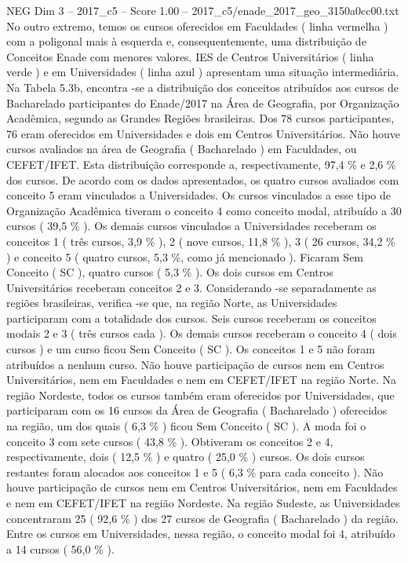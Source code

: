 \begin{textsample}{NEG Dim 3 – 2017\_c5 – Score 1.00 – 2017\_c5/enade\_2017\_geo\_3150a0cc00.txt}
No outro extremo, temos os cursos oferecidos em Faculdades ( linha vermelha ) com a poligonal mais à esquerda e, consequentemente, uma distribuição de Conceitos Enade com menores valores.
IES de Centros Universitários ( linha verde ) e em Universidades ( linha azul ) apresentam uma situação intermediária.
Na Tabela 5.3b, encontra -se a distribuição dos conceitos atribuídos aos cursos de Bacharelado participantes do Enade/2017 na Área de Geografia, por Organização Acadêmica, segundo as Grandes Regiões brasileiras.
Dos 78 cursos participantes, 76 eram oferecidos em Universidades e dois em Centros Universitários.
Não houve cursos avaliados na área de Geografia ( Bacharelado ) em Faculdades, ou CEFET/IFET.
Esta distribuição corresponde a, respectivamente, 97,4 \% e 2,6 \% dos cursos.
De acordo com os dados apresentados, os quatro cursos avaliados com conceito 5 eram vinculados a Universidades.
Os cursos vinculados a esse tipo de Organização Acadêmica tiveram o conceito 4 como conceito modal, atribuído a 30 cursos ( 39,5 \% ).
Os demais cursos vinculados a Universidades receberam os conceitos 1 ( três cursos, 3,9 \% ), 2 ( nove cursos, 11,8 \% ), 3 ( 26 cursos, 34,2 \% ) e conceito 5 ( quatro cursos, 5,3 \%, como já mencionado ).
Ficaram Sem Conceito ( SC ), quatro cursos ( 5,3 \% ).
Os dois cursos em Centros Universitários receberam conceitos 2 e 3.
Considerando -se separadamente as regiões brasileiras, verifica -se que, na região Norte, as Universidades participaram com a totalidade dos cursos.
Seis cursos receberam os conceitos modais 2 e 3 ( três cursos cada ).
Os demais cursos receberam o conceito 4 ( dois cursos ) e um curso ficou Sem Conceito ( SC ).
Os conceitos 1 e 5 não foram atribuídos a nenhum curso.
Não houve participação de cursos nem em Centros Universitários, nem em Faculdades e nem em CEFET/IFET na região Norte.
Na região Nordeste, todos os cursos também eram oferecidos por Universidades, que participaram com os 16 cursos da Área de Geografia ( Bacharelado ) oferecidos na região, um dos quais ( 6,3 \% ) ficou Sem Conceito ( SC ).
A moda foi o conceito 3 com sete cursos ( 43,8 \% ).
Obtiveram os conceitos 2 e 4, respectivamente, dois ( 12,5 \% ) e quatro ( 25,0 \% ) cursos.
Os dois cursos restantes foram alocados aos conceitos 1 e 5 ( 6,3 \% para cada conceito ).
Não houve participação de cursos nem em Centros Universitários, nem em Faculdades e nem em CEFET/IFET na região Nordeste.
Na região Sudeste, as Universidades concentraram 25 ( 92,6 \% ) dos 27 cursos de Geografia ( Bacharelado ) da região.
Entre os cursos em Universidades, nessa região, o conceito modal foi 4, atribuído a 14 cursos ( 56,0 \% ).

\end{textsample}
